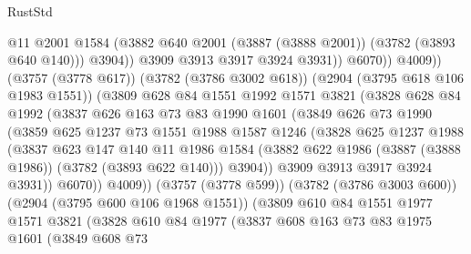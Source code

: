 \begin{lexlean}{RustStd}
\begin{coremodule}
                              @11
                              @2001
                              @1584
                              (@3882 @640 @2001 (@3887 (@3888 @2001)) (@3782 (@3893 @640 @140)))
                              @3904))
                          @3909
                          @3913
                          @3917
                          @3924
                          @3931))
                      @6070))
                  @4009))
              (@3757 (@3778 @617))
              (@3782 (@3786 @3002 @618))
              (@2904 (@3795 @618 @106 @1983 @1551))
              (@3809
                @628
                @84
                @1551
                @1992
                @1571
                @3821
                (@3828
                  @628
                  @84
                  @1992
                  (@3837
                    @626
                    @163
                    @73
                    @83
                    @1990
                    @1601
                    (@3849
                      @626
                      @73
                      @1990
                      (@3859
                        @625
                        @1237
                        @73
                        @1551
                        @1988
                        @1587
                        @1246
                        (@3828
                          @625
                          @1237
                          @1988
                          (@3837
                            @623
                            @147
                            @140
                            @11
                            @1986
                            @1584
                            (@3882 @622 @1986 (@3887 (@3888 @1986)) (@3782 (@3893 @622 @140)))
                            @3904))
                        @3909
                        @3913
                        @3917
                        @3924
                        @3931))
                    @6070))
                @4009))
            (@3757 (@3778 @599))
            (@3782 (@3786 @3003 @600))
            (@2904 (@3795 @600 @106 @1968 @1551))
            (@3809
              @610
              @84
              @1551
              @1977
              @1571
              @3821
              (@3828
                @610
                @84
                @1977
                (@3837
                  @608
                  @163
                  @73
                  @83
                  @1975
                  @1601
                  (@3849
                    @608
                    @73

\end{coremodule}
\end{lexlean}
